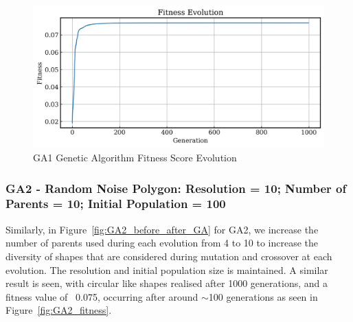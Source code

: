 \documentclass{article}
\begin{document}
\begin{figure}[H]
    \centering
    \includegraphics[width=0.75\linewidth]{figures/GAResults/GA1/1000gens_4pars_100initpop_5pcent_mut.png}
    \caption{GA1 Genetic Algorithm Fitness Score Evolution}
    \label{fig:GA1_fitness_curve}
\end{figure}

\subsubsection*{GA2 - Random Noise Polygon: Resolution = 10; Number of Parents = 10; Initial Population = 100}

Similarly, in Figure~\ref{fig:GA2_before_after_GA} for GA2, we increase the number of parents used during each evolution from 4 to 10 to increase the diversity of shapes that are considered during mutation and crossover at each evolution. The resolution and initial population size is maintained. A similar result is seen, with circular like shapes realised after 1000 generations, and a fitness value of ~0.075, occurring after around $\sim$100 generations as seen in Figure~\ref{fig:GA2_fitness}.
\end{document}
